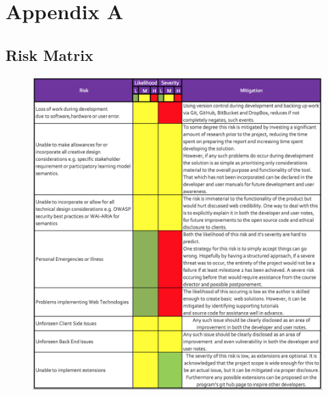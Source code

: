 %
%

\chapter{Appendix A}
\label{app:app01}

\section{Risk Matrix}

\begin{figure}[H]
	\centering
	\includegraphics[scale=.68]{figures/risk}
	\label{fig:Risk Matrix}
\end{figure}
\newpage


